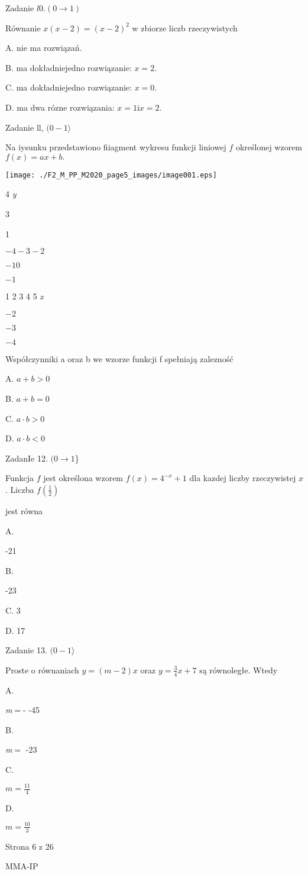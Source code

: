 \documentclass[a4paper,12pt]{article}
\begin{document}
Zadanie $l0. (0\rightarrow 1)$

Równanie $x(x-2)=(x-2)^{2}$ w zbiorze liczb rzeczywistych

A. nie ma rozwiązań.

B. ma dokładniejedno rozwiązanie: $x=2.$

C. ma dokładniejedno rozwiązanie: $x=0.$

D. ma dwa rózne rozwiązania: $x=1 \mathrm{i}x=2.$

Zadanie ll, $(0-1\rangle$

Na iysunku przedstawiono fiiagment wykresu funkcji liniowej $f$ określonej wzorem $f(x)=ax+b.$
\begin{center}
\texttt{[image: ./F2\_M\_PP\_M2020\_page5\_images/image001.eps]}
\end{center}
4  {\it y}

3

1

$-4 -3  -2$

$-1 0$

$-1$

1 2 3 4  5  {\it x}

$-2$

$-3$

$-4$

Współczynniki a oraz b we wzorze funkcji f spełniają zalezność

A. $a+b>0$

B. $a+b=0$

C. $a\cdot b>0$

D. $a\cdot b<0$

ZadanIe 12. $(0\rightarrow 1$\}

Funkcja $f$ jest określona wzorem $f(x)=4^{-x}+1$ dla kazdej liczby rzeczywistej $x$. Liczba $f(\displaystyle \frac{1}{2})$

jest równa

A.

-21

B.

-23

C. 3

D. 17

Zadanie 13. $(0-1\rangle$

Proste o równaniach $y=(m-2)x$ oraz $y=\displaystyle \frac{3}{4}x+7$ są równoległe. Wtedy

A.

{\it m}$=$- -45

B.

{\it m}$=$ -23

C.

$m=\displaystyle \frac{11}{4}$

D.

$m=\displaystyle \frac{10}{3}$

Strona 6 z 26

MMA-IP
\end{document}
